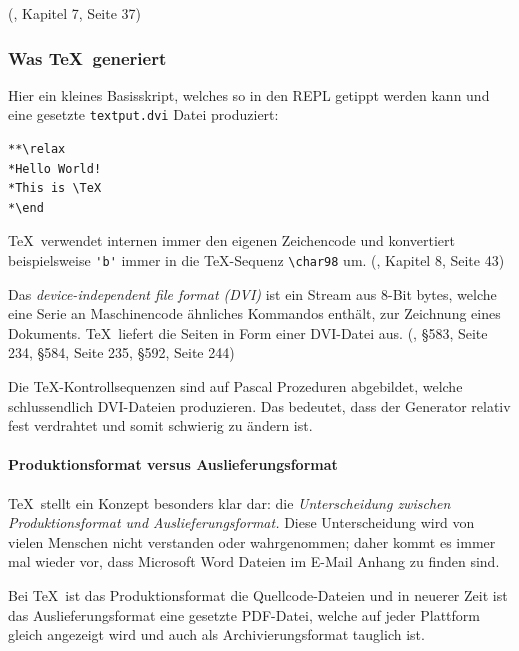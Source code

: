 (\cite{tex-a}, Kapitel 7, Seite 37)

\subsubsection{Was \TeX~generiert}

Hier ein kleines Basisskript, welches so in den REPL getippt werden kann und
eine gesetzte \lstinline|textput.dvi| Datei produziert:

\begin{verbatim}
**\relax
*Hello World!
*This is \TeX
*\end
\end{verbatim}

\TeX~verwendet internen immer den eigenen Zeichencode und konvertiert beispielsweise
\lstinline|'b'| immer in die \TeX-Sequenz \lstinline|\char98| um.
(\cite{tex-a}, Kapitel 8, Seite 43)

Das \emph{device-independent file format (DVI)} ist ein Stream aus
8-Bit bytes, welche eine Serie an
Maschinencode ähnliches Kommandos enthält, zur Zeichnung eines Dokuments.
\TeX~liefert die Seiten in Form einer DVI-Datei aus.
(\cite{tex-b}, §583, Seite 234, §584, Seite 235, §592, Seite 244)

Die \TeX-Kontrollsequenzen sind auf Pascal Prozeduren abgebildet,
welche schlussendlich DVI-Dateien produzieren. Das bedeutet, dass der Generator
relativ fest verdrahtet und somit schwierig zu ändern ist.

\paragraph{Produktionsformat versus Auslieferungsformat}

\TeX~stellt ein Konzept besonders klar dar: die \emph{Unterscheidung
zwischen Produktionsformat und Auslieferungsformat.} Diese Unterscheidung
wird von vielen Menschen nicht verstanden oder wahrgenommen; daher kommt
es immer mal wieder vor, dass Microsoft Word Dateien im E-Mail Anhang zu
finden sind.

Bei \TeX~ist das Produktionsformat die Quellcode-Dateien und in neuerer
Zeit ist das Auslieferungsformat eine gesetzte PDF-Datei, welche auf jeder
Plattform gleich angezeigt wird und auch als Archivierungsformat tauglich
ist.
